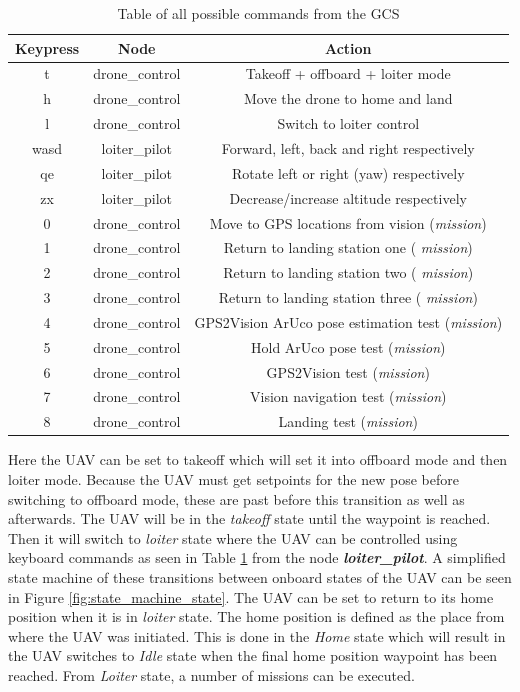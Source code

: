 \documentclass[../Head/report.tex]{subfiles}
\begin{document}
\begin{table}[H]
\centering
\begin{tabular}{ccc}
\hline
\textbf{Keypress} & \textbf{Node} & \textbf{Action}                                    \\ \hline
t                 & drone\_control & Takeoff + offboard + loiter mode         \\
h                 & drone\_control & Move the drone to home and land         \\
l                 & drone\_control & Switch to loiter control 
\\
wasd              & loiter\_pilot & Forward, left, back and right respectively           \\
qe                & loiter\_pilot & Rotate left or right (yaw) respectively             \\
zx                & loiter\_pilot & Decrease/increase altitude respectively
\\
0                 & drone\_control & Move to GPS locations from vision (\textit{mission})
\\
1                 & drone\_control & Return to landing station one ( \textit{mission})
\\
2                 & drone\_control & Return to landing station two ( \textit{mission})
\\
3                 & drone\_control & Return to landing station three ( \textit{mission})
\\
4                 & drone\_control & GPS2Vision ArUco pose estimation test (\textit{mission})  
\\
5                 & drone\_control & Hold ArUco pose test (\textit{mission})  
\\
6                 & drone\_control & GPS2Vision test (\textit{mission})  
\\
7                 & drone\_control & Vision navigation test (\textit{mission})
\\
8                 & drone\_control & Landing test (\textit{mission})  
\end{tabular}
\caption{Table of all possible commands from the GCS}
\label{tab:ros_commands}
\end{table}

Here the UAV can be set to takeoff which will set it into offboard mode and then loiter mode. Because the UAV must get setpoints for the new pose before switching to offboard mode, these are past before this transition as well as afterwards. The UAV will be in the \textit{takeoff} state until the waypoint is reached. Then it will switch to \textit{loiter} state where the UAV can be controlled using keyboard commands as seen in Table \ref{tab:ros_commands} from the node \textbf{\textit{loiter\_pilot}}. A simplified state machine of these transitions between onboard states of the UAV can be seen in Figure \ref{fig:state_machine_state}. The UAV can be set to return to its home position when it is in \textit{loiter} state. The home position is defined as the place from where the UAV was initiated. This is done in the \textit{Home} state which will result in the UAV switches to \textit{Idle} state when the final home position waypoint has been reached. From \textit{Loiter} state, a number of missions can be executed. 
\end{document}
